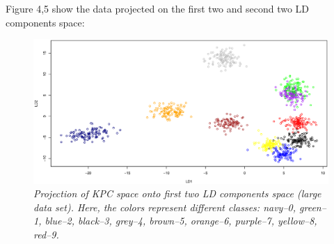 \documentclass{article}
\begin{document}

Figure 4,5 show the data projected on the first two and second two LD components space:

\begin{figure}[htp]
\centering
\includegraphics[width=12.1cm]{large_kpcalda_LD12_train.eps}
\caption{\textit{Projection of KPC space onto first two LD components space (large data set). Here, the colors represent different classes: navy--0, green--1, 
blue--2, black--3, grey--4, brown--5, orange--6, purple--7, yellow--8, red--9.}}
\end{figure}
\end{document}
